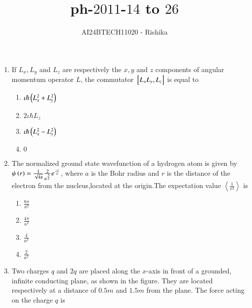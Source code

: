 \documentclass[journal,12pt,onecolumn]{IEEEtran}
\theoremstyle{remark}
\begin{document}

\vspace{3cm}

\title{ph-$2011$-$14$ to $26$}
\author{AI24BTECH11020 - Rishika}
\maketitle
\bigskip
\renewcommand{\thefigure}{\theenumi}
\renewcommand{\thetable}{\theenumi}
\begin{enumerate}[start=14]
\item If $L_x,L_y$ and $L_z$ are respectively the $x,y$ and $z$ components of angular momentum operator $L$, the commutator ${}\left[L_xL_y,L_z\right]$ is equal to
                \begin{enumerate}
        \item $\iota\hbar\left(L_x^2+L_y^2\right)$
        \item $2\iota\hbar L_z$
        \item $\iota\hbar\left(L_x^2-L_y^2\right)$
        \item $0$
                \end{enumerate}
\item The normalized ground state wavefunction of a hydrogen atom is given by $\psi\left(r\right)=\frac{1}{\sqrt{4\pi}}\frac{2}{a^{\frac{3}{2}}}e^{\frac{-r}{a}}$, where $a$ is the Bohr radius and $r$ is the distance of the electron from the nucleus,located at the origin.The expectation value $\left\langle \frac{1}{r^2} \right\rangle$ is
                \begin{enumerate}
                        \item $\frac{8\pi}{a^2}$
                        \item $\frac{4\pi}{a^2}$
                        \item $\frac{4}{a^2}$
                        \item $\frac{2}{a^2}$
                \end{enumerate}
\item Two charges $q$ and $2q$ are placed along the $x$-axis in front of a grounded, infinite conducting plane, as shown in the figure. They are located respectively at a distance of $0.5 m$ and $1.5 m$ from the plane. The force acting on the charge $q$ is\\
        \begin{center}
\end{center}
\end{enumerate}
\end{document}
